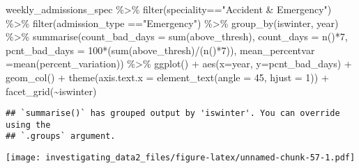 \documentclass[
]{article}
\newenvironment{Shaded}{\begin{snugshade}}{\end{snugshade}}
\newcommand{\AttributeTok}[1]{\textcolor[rgb]{0.77,0.63,0.00}{#1}}
\newcommand{\DecValTok}[1]{\textcolor[rgb]{0.00,0.00,0.81}{#1}}
\newcommand{\FunctionTok}[1]{\textcolor[rgb]{0.00,0.00,0.00}{#1}}
\newcommand{\NormalTok}[1]{#1}
\newcommand{\SpecialCharTok}[1]{\textcolor[rgb]{0.00,0.00,0.00}{#1}}
\newcommand{\StringTok}[1]{\textcolor[rgb]{0.31,0.60,0.02}{#1}}
\begin{document}
\begin{Shaded}
\begin{Highlighting}[]
\NormalTok{weekly\_admissions\_spec }\SpecialCharTok{\%\textgreater{}\%} 
  \FunctionTok{filter}\NormalTok{(speciality}\SpecialCharTok{==}\StringTok{"Accident \& Emergency"}\NormalTok{) }\SpecialCharTok{\%\textgreater{}\%} 
  \FunctionTok{filter}\NormalTok{(admission\_type }\SpecialCharTok{==}\StringTok{"Emergency"}\NormalTok{) }\SpecialCharTok{\%\textgreater{}\%} 
  \FunctionTok{group\_by}\NormalTok{(iswinter, year) }\SpecialCharTok{\%\textgreater{}\%} 
  \FunctionTok{summarise}\NormalTok{(}\AttributeTok{count\_bad\_days =} \FunctionTok{sum}\NormalTok{(above\_thresh), }
            \AttributeTok{count\_days =} \FunctionTok{n}\NormalTok{()}\SpecialCharTok{*}\DecValTok{7}\NormalTok{, }
            \AttributeTok{pcnt\_bad\_days =} \DecValTok{100}\SpecialCharTok{*}\NormalTok{(}\FunctionTok{sum}\NormalTok{(above\_thresh)}\SpecialCharTok{/}\NormalTok{(}\FunctionTok{n}\NormalTok{()}\SpecialCharTok{*}\DecValTok{7}\NormalTok{)), }
            \AttributeTok{mean\_percentvar =}\FunctionTok{mean}\NormalTok{(percent\_variation)) }\SpecialCharTok{\%\textgreater{}\%} 
  \FunctionTok{ggplot}\NormalTok{() }\SpecialCharTok{+}
  \FunctionTok{aes}\NormalTok{(}\AttributeTok{x=}\NormalTok{year, }\AttributeTok{y=}\NormalTok{pcnt\_bad\_days) }\SpecialCharTok{+}
  \FunctionTok{geom\_col}\NormalTok{() }\SpecialCharTok{+}
  \FunctionTok{theme}\NormalTok{(}\AttributeTok{axis.text.x =} \FunctionTok{element\_text}\NormalTok{(}\AttributeTok{angle =} \DecValTok{45}\NormalTok{, }\AttributeTok{hjust =} \DecValTok{1}\NormalTok{)) }\SpecialCharTok{+}
  \FunctionTok{facet\_grid}\NormalTok{(}\SpecialCharTok{\textasciitilde{}}\NormalTok{iswinter)}
\end{Highlighting}
\end{Shaded}

\begin{verbatim}
## `summarise()` has grouped output by 'iswinter'. You can override using the
## `.groups` argument.
\end{verbatim}

\texttt{[image: investigating\_data2\_files/figure-latex/unnamed-chunk-57-1.pdf]}
\end{document}
